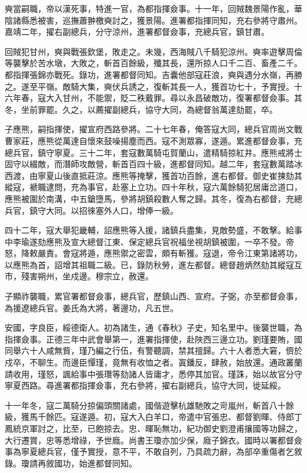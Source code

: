 \begin{pinyinscope}
奭當嗣職，帝以漢死事，特進一官，為都指揮僉事。十一年，回賊魏景陽作亂，華陰諸縣悉被害，巡撫蕭翀檄奭討之，獲景陽。進署都指揮同知，充右參將守肅州。嘉靖二年，擢右副總兵，分守涼州，進署都督僉事，充總兵官，鎮甘肅。

回賊犯甘州，奭與戰張欽堡，敗走之。未幾，西海賊八千騎犯涼州。奭率遊擊周倫等襲擊於苦水墩，大敗之，斬首百餘級，殲其長，還所掠人口千二百、畜產二千。都指揮張錦亦戰死。錄功，進署都督同知。吉囊他部寇莊浪，奭與遇分水嶺，再勝之。遂至平嶺。敵騎大集，奭伏兵誘之，復斬其長一人，獲首功七十，予實授。十六年春，寇大入甘州，不能禦，貶二秩戴罪。尋以永昌破敵功，復署都督僉事。其冬，坐前罪罷。久之，以薦擢副總兵，協守大同，為總督翁萬達劾罷，卒。

子應熊，嗣指揮使，擢宣府西路參將。二十七年春，俺答寇大同，總兵官周尚文戰曹家莊，應熊從萬達自懷來鼓噪揚塵而西。寇不測眾寡，遂遁。累進都督僉事，充總兵官，鎮守寧夏。三十二年，套寇數萬騎屯賀蘭山，遣精騎掠紅井。應熊戒將士固守以綴敵，而潛師攻敵營，斬首百四十級，進都督同知。越二年，套寇數萬踏冰西渡，由寧夏山後直抵莊涼。應熊等掩擊，獲首功百餘，進右都督。御史崔揀劾其縱寇，褫職逮問，充為事官，赴塞上立功。四十年秋，寇六萬餘騎犯居庸岔道口，應熊被圍於南溝，中五鎗墮馬，參將胡鎮殺數人奪之歸。其冬，復為右都督，充總兵官，鎮守大同。以招徠塞外人口，增俸一級。

四十二年，寇大舉犯畿輔，詔應熊等入援，諸鎮兵盡集，見敵勢盛，不敢擊。給事中李瑜遂劾應熊及宣大總督江東、保定總兵官祝福坐視胡鎮被圍，一卒不發。帝怒，降敕嚴責。會寇將遁，應熊禦之密雲，頗有斬獲。寇退，帝令江東第諸將功，以應熊為首，詔增其祖職二級。已，錄防秋勞，進左都督。總督趙炳然劾其縱寇互市，殘害朔州，坐戍邊。穆宗立，赦還。

子顯祚襲職，累官署都督僉事，總兵官，歷鎮山西、宣府。子弼，亦至都督僉事，為援遼總兵官。姜氏為大將，著邊功，凡五世。

安國，字良臣，綏德衛人。初為諸生，通《春秋》子史，知名里中。後襲世職，為指揮僉事。正德三年中武會舉第一，進署指揮使，赴陜西三邊立功。劉瑾要賄，國同舉六十人咸無貲，瑾乃編之行伍，有警聽調，禁其擅歸。六十人者悉大窘，儕於戍卒，不聊生。而邊臣憚瑾，竟無有收恤之者。寘鐇反，肆赦，始放還。通政叢蘭請收用，瑾怒，諷給事中張瓚等劾諸人皆庸才，悉停其加官。瑾誅，始以故官分守寧夏西路。尋進署都指揮僉事，充右參將，擢右副總兵，協守大同，徙延綏。

十一年冬，寇二萬騎分掠偏頭關諸處，國偕遊擊杭雄馳敗之岢嵐州，斬首八十餘級，獲馬千餘匹。寇遂遁。初，寇大入白羊口，帝遣中官張忠、都督劉暉、侍郎丁鳳統京軍討之，比至，已飽掠去。忠、暉恥無功，紀功御史劉澄甫攘國等功歸之，大行遷賞，忠等悉增祿，予世廕。尚書王瓊亦加少保，廕子錦衣。國時以署都督僉事為寧夏總兵官，僅予實授，意不平，不敢自列，乃具疏力辭，為部卒重傷者乞敘錄。瓊請再敘國功，始進都督同知。


\end{pinyinscope}
